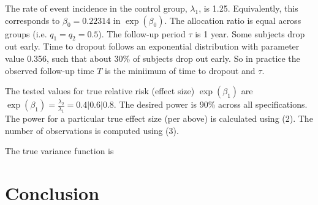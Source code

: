 \documentclass{article}
\begin{document}
The rate of event incidence in the control group, $\lambda_1$, is 1.25.
Equivalently, this corresponds to $\beta_0 = 0.22314$ in $\exp{(\beta_0)}$. The
allocation ratio is equal across groups (i.e. $q_1 = q_2 = 0.5$). The follow-up
period $\tau$ is 1 year. Some subjects drop out early. Time to dropout follows
an exponential distribution with parameter value 0.356, such that about 30\% of
subjects drop out early. So in practice the observed follow-up time $T$ is the
miniimum of time to dropout and $\tau$.

The tested values for true relative risk (effect size) $\exp{(\beta_1)}$ are $\exp{(\beta_1)} = \frac{\lambda_2}{\lambda_1}
= 0.4 | 0.6 | 0.8$. The desired power is 90\% across all specifications. 
The power for a particular true effect size (per above) is calculated using (2). 
The number of observations is computed using (3).

The true variance function is 

\section{Conclusion}

\printbibliography[heading=bibnumbered]
\end{document}
